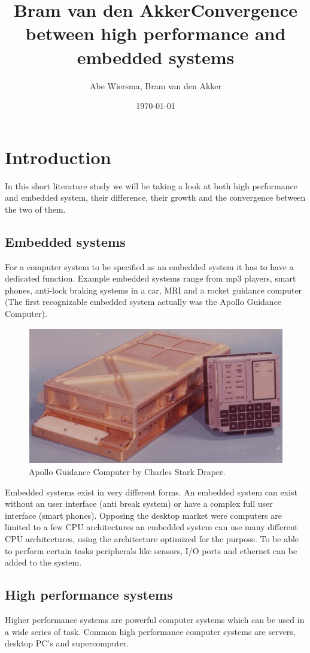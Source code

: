 \documentclass[10pt]{article}
\title{\bfseries\Huge Bram van den Akker}
\date{}
\begin{document}
\title{Convergence between high performance and embedded systems}
\author{Abe Wiersma, Bram van den Akker}
\date{\today}
\maketitle
\newpage

\section{Introduction}
In this short literature study we will be taking a look at both high performance and embedded system, their difference, their growth and the convergence between the two of them. 

\subsection{Embedded systems}
For a computer system to be specified as an embedded system it has to have a dedicated function. Example embedded systems range from mp3 players, smart phones, anti-lock braking systems in a car, MRI and a rocket guidance computer (The first recognizable embedded system actually was the Apollo Guidance Computer). 

\begin{figure}[h]
  \centering
    \includegraphics[width=\textwidth]{apollo.jpg}
  \caption {Apollo Guidance Computer by Charles Stark Draper.}
\end{figure}

Embedded systems exist in very different forms. An embedded system can exist without an user interface (anti break system) or have a complex full user interface (smart phones). Opposing the desktop market were computers are limited to a few CPU architectures an embedded system can use many different CPU architectures, using the architecture optimized for the purpose. To be able to perform certain tasks peripherals like sensors, I/O ports and ethernet can be added to the system. 

\subsection{High performance systems}
Higher performance systems are powerful computer systems which can be used in a wide series of task. Common high performance computer systems are servers, desktop PC's and supercomputer.
\end{document}
